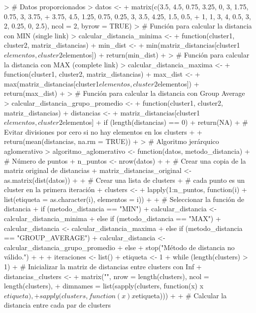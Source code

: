 \documentclass[a4paper, 12pt]{article}
\begin{document}
\begin{Schunk}
\begin{Sinput}
> # Datos proporcionados
> datos <- 
+   matrix(c(3.5, 4.5, 0.75, 3.25, 0, 3, 1.75, 0.75, 3, 3.75,
+                   3.75, 4.5, 1.25, 0.75, 0.25, 3, 3.5, 4.25, 1.5, 0.5,
+                   1, 1, 3, 4, 0.5, 3, 2, 0.25, 0, 2.5), ncol = 2, byrow = TRUE)
> # Función para calcular la distancia con MIN (single link)
> calcular_distancia_minima <- 
+   function(cluster1, cluster2, matriz_distancias) {
+   min_dist <- 
+     min(matriz_distancias[cluster1$elementos, cluster2$elementos])
+   return(min_dist)
+ }
> # Función para calcular la distancia con MAX (complete link)
> calcular_distancia_maxima <- 
+   function(cluster1, cluster2, matriz_distancias) {
+   max_dist <- 
+     max(matriz_distancias[cluster1$elementos, cluster2$elementos])
+   return(max_dist)
+ }
> # Función para calcular la distancia con Group Average
> calcular_distancia_grupo_promedio <- 
+   function(cluster1, cluster2, matriz_distancias) {
+   distancias <- 
+     matriz_distancias[cluster1$elementos, cluster2$elementos]
+   if (length(distancias) == 0) {
+     return(NA)  
+     # Evitar divisiones por cero si no hay elementos en los clusters
+   }
+   return(mean(distancias, na.rm = TRUE))
+ }
> # Algoritmo jerárquico aglomerativo
> algoritmo_aglomerativo <- function(datos, metodo_distancia) {
+   # Número de puntos
+   n_puntos <- nrow(datos)
+   
+   # Crear una copia de la matriz original de distancias
+   matriz_distancias_original <- as.matrix(dist(datos))
+   
+   # Crear una lista de clusters
+   # cada punto es un cluster en la primera iteración
+   clusters <- 
+     lapply(1:n_puntos, function(i) 
+       list(etiqueta = as.character(i), elementos = i))
+   
+   # Seleccionar la función de distancia
+   if (metodo_distancia == "MIN") {
+     calcular_distancia <- calcular_distancia_minima
+   } else if (metodo_distancia == "MAX") {
+     calcular_distancia <- calcular_distancia_maxima
+   } else if (metodo_distancia == "GROUP_AVERAGE") {
+     calcular_distancia <- calcular_distancia_grupo_promedio
+   } else {
+     stop("Método de distancia no válido.")
+   }
+   
+   iteraciones <- list()
+   etiqueta <- 1
+   while (length(clusters) > 1) {
+     # Inicializar la matriz de distancias entre clusters con Inf
+     distancias_clusters <- 
+       matrix("", nrow = length(clusters), ncol = length(clusters), 
+              dimnames = list(sapply(clusters, function(x) x$etiqueta), 
+                              sapply(clusters, function(x) x$etiqueta)))
+     
+     # Calcular la distancia entre cada par de clusters
}}
\end{Sinput}
\end{Schunk}
\end{document}
